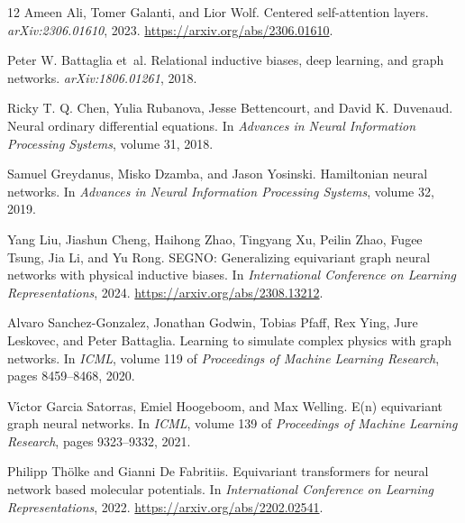 \documentclass[10pt,letterpaper,twocolumn]{article}
\numberwithin{equation}{section}
\begin{document}
\begin{thebibliography}{12}
Ameen Ali, Tomer Galanti, and Lior Wolf.
\newblock Centered self-attention layers.
\newblock \emph{arXiv:2306.01610}, 2023.
\newblock \url{https://arxiv.org/abs/2306.01610}.

Peter W. Battaglia et~al.
\newblock Relational inductive biases, deep learning, and graph networks.
\newblock \emph{arXiv:1806.01261}, 2018.

Ricky T. Q. Chen, Yulia Rubanova, Jesse Bettencourt, and David K. Duvenaud.
\newblock Neural ordinary differential equations.
\newblock In \emph{Advances in Neural Information Processing Systems}, volume 31, 2018.

Samuel Greydanus, Misko Dzamba, and Jason Yosinski.
\newblock Hamiltonian neural networks.
\newblock In \emph{Advances in Neural Information Processing Systems}, volume 32, 2019.

Yang Liu, Jiashun Cheng, Haihong Zhao, Tingyang Xu, Peilin Zhao, Fugee Tsung, Jia Li, and Yu Rong.
\newblock SEGNO: Generalizing equivariant graph neural networks with physical inductive biases.
\newblock In \emph{International Conference on Learning Representations}, 2024.
\newblock \url{https://arxiv.org/abs/2308.13212}.

Alvaro Sanchez-Gonzalez, Jonathan Godwin, Tobias Pfaff, Rex Ying, Jure Leskovec, and Peter Battaglia.
\newblock Learning to simulate complex physics with graph networks.
\newblock In \emph{ICML}, volume 119 of \emph{Proceedings of Machine Learning Research}, pages 8459--8468, 2020.

V{\'\i}ctor Garcia Satorras, Emiel Hoogeboom, and Max Welling.
\newblock E(n) equivariant graph neural networks.
\newblock In \emph{ICML}, volume 139 of \emph{Proceedings of Machine Learning Research}, pages 9323--9332, 2021.

Philipp Th{\"o}lke and Gianni De Fabritiis.
\newblock Equivariant transformers for neural network based molecular potentials.
\newblock In \emph{International Conference on Learning Representations}, 2022.
\newblock \url{https://arxiv.org/abs/2202.02541}.


\end{thebibliography}
\end{document}
